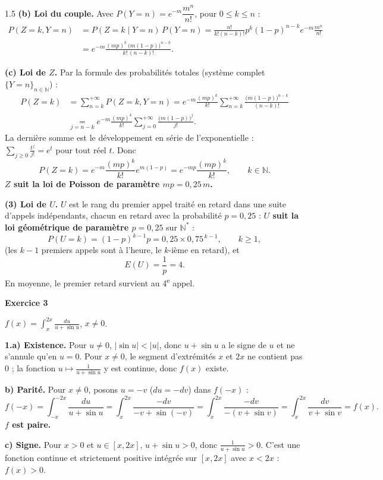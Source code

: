 \documentclass[12pt]{article}
\begin{document}
\begin{spacing}{1.5}
\textbf{(b) Loi du couple.} Avec $P(Y=n)=e^{-m}\dfrac{m^n}{n!}$, pour $0\le k\le n$ :
\begin{align*}
P(Z=k,Y=n)&=P(Z=k\mid Y=n)\,P(Y=n)=\frac{n!}{k!(n-k)!}p^k(1-p)^{n-k}e^{-m}\frac{m^n}{n!}\\
&=e^{-m}\frac{(mp)^k\,\big(m(1-p)\big)^{n-k}}{k!\,(n-k)!}.
\end{align*}

\textbf{(c) Loi de $Z$.} Par la formule des probabilités totales (système complet $\{Y=n\}_{n\in\mathbb{N}}$) :
\begin{align*}
P(Z=k)&=\sum_{n=k}^{+\infty}P(Z=k,Y=n)=e^{-m}\frac{(mp)^k}{k!}\sum_{n=k}^{+\infty}\frac{\big(m(1-p)\big)^{n-k}}{(n-k)!}\\
&\underset{j=n-k}{=}e^{-m}\frac{(mp)^k}{k!}\sum_{j=0}^{+\infty}\frac{\big(m(1-p)\big)^{j}}{j!}.
\end{align*}
La dernière somme est le développement en série de l'exponentielle : $\sum_{j\ge0}\frac{t^j}{j!}=e^t$ pour tout réel $t$. Donc
\[
P(Z=k)=e^{-m}\frac{(mp)^k}{k!}e^{m(1-p)}=e^{-mp}\frac{(mp)^k}{k!},\qquad k\in\mathbb{N}.
\]
\textbf{$Z$ suit la loi de Poisson de paramètre $mp=0{,}25\,m$.}

\textbf{(3) Loi de $U$.} $U$ est le rang du premier appel traité en retard dans une suite d'appels indépendants, chacun en retard avec la probabilité $p=0{,}25$ : \textbf{$U$ suit la loi géométrique de paramètre $p=0{,}25$} sur $\mathbb{N}^*$ :
\[
P(U=k)=(1-p)^{k-1}p=0{,}25\times0{,}75^{\,k-1},\qquad k\ge1,
\]
(les $k-1$ premiers appels sont à l'heure, le $k$-ième en retard), et
\[
E(U)=\frac1p=\boxed{4}.
\]
En moyenne, le premier retard survient au 4\textsuperscript{e} appel.

\medskip\textbf{Exercice 3}

$f(x)=\displaystyle\int_x^{2x}\frac{du}{u+\sin u}$, $x\neq0$.

\textbf{1.a) Existence.} Pour $u\neq0$, $|\sin u|<|u|$, donc $u+\sin u$ a le signe de $u$ et ne s'annule qu'en $u=0$. Pour $x\neq0$, le segment d'extrémités $x$ et $2x$ ne contient pas $0$ ; la fonction $u\mapsto\frac{1}{u+\sin u}$ y est continue, donc $f(x)$ existe.

\textbf{b) Parité.} Pour $x\neq0$, posons $u=-v$ ($du=-dv$) dans $f(-x)$ :
\[
f(-x)=\int_{-x}^{-2x}\frac{du}{u+\sin u}=\int_{x}^{2x}\frac{-dv}{-v+\sin(-v)}=\int_x^{2x}\frac{-dv}{-(v+\sin v)}=\int_x^{2x}\frac{dv}{v+\sin v}=f(x).
\]
\textbf{$f$ est paire.}

\textbf{c) Signe.} Pour $x>0$ et $u\in[x,2x]$, $u+\sin u>0$, donc $\frac1{u+\sin u}>0$. C'est une fonction continue et strictement positive intégrée sur $[x,2x]$ avec $x<2x$ : $f(x)>0$.


\end{spacing}
\end{document}
